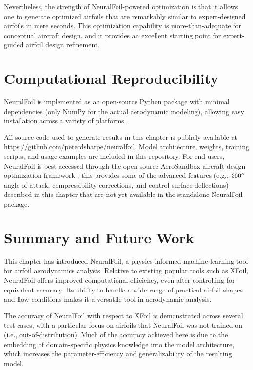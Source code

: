 Nevertheless, the strength of NeuralFoil-powered optimization is that it allows one to generate optimized airfoils that are remarkably similar to expert-designed airfoils in mere seconds. This optimization capability is more-than-adequate for conceptual aircraft design, and it provides an excellent starting point for expert-guided airfoil design refinement.


\section{Computational Reproducibility}
\label{sec:nf-reproducibility}

NeuralFoil is implemented as an open-source Python package with minimal dependencies (only NumPy \cite{harris_array_2020} for the actual aerodynamic modeling), allowing easy installation across a variety of platforms.

All source code used to generate results in this chapter is publicly available at \url{https://github.com/peterdsharpe/neuralfoil}. Model architecture, weights, training scripts, and usage examples are included in this repository.
For end-users, NeuralFoil is best accessed through the open-source AeroSandbox aircraft design optimization framework \cite{sharpe_aerosandbox_2021}; this provides some of the advanced features (e.g., $360\degree$ angle of attack, compressibility corrections, and control surface deflections) described in this chapter that are not yet available in the standalone NeuralFoil package.


\section{Summary and Future Work}
\label{sec:conclusion}

This chapter has introduced NeuralFoil, a physics-informed machine learning tool for airfoil aerodynamics analysis. Relative to existing popular tools such as XFoil, NeuralFoil offers improved computational efficiency, even after controlling for equivalent accuracy. Its ability to handle a wide range of practical airfoil shapes and flow conditions makes it a versatile tool in aerodynamic analysis.

The accuracy of NeuralFoil with respect to XFoil is demonstrated across several test cases, with a particular focus on airfoils that NeuralFoil was not trained on (i.e., out-of-distribution). Much of the accuracy achieved here is due to the embedding of domain-specific physics knowledge into the model architecture, which increases the parameter-efficiency and generalizability of the resulting model.

